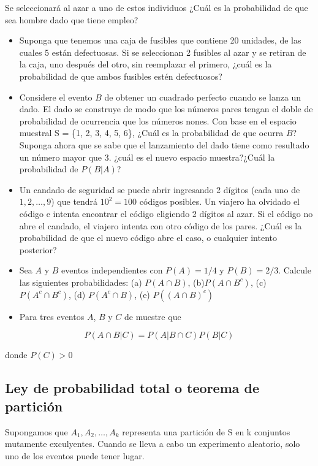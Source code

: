 \documentclass[11pt]{article}
\begin{document}
Se seleccionará al azar a uno de estos individuos ¿Cuál es la
probabilidad de que sea hombre dado que tiene empleo?

\begin{itemize}
\item
  Suponga que tenemos una caja de fusibles que contiene 20 unidades, de
  las cuales 5 están defectuosas. Si se seleccionan 2 fusibles al azar y
  se retiran de la caja, uno después del otro, sin reemplazar el
  primero, ¿cuál es la probabilidad de que ambos fusibles estén
  defectuosos?
\item
  Considere el evento \(B\) de obtener un cuadrado perfecto cuando se
  lanza un dado. El dado se construye de modo que los números pares
  tengan el doble de probabilidad de ocurrencia que los números nones.
  Con base en el espacio muestral S = \{1, 2, 3, 4, 5, 6\}, ¿Cuál es la
  probabilidad de que ocurra \(B\)? Suponga ahora que se sabe que el
  lanzamiento del dado tiene como resultado un número mayor que 3. ¿cuál
  es el nuevo espacio muestra?¿Cuál la probabilidad de \(P(B\vert A)\)?
\item
  Un candado de seguridad se puede abrir ingresando 2 dígitos (cada uno
  de \(1, 2,\ldots, 9\)) que tendrá \(10^{2} = 100\) códigos posibles.
  Un viajero ha olvidado el código e intenta encontrar el código
  eligiendo 2 dígitos al azar. Si el código no abre el candado, el
  viajero intenta con otro código de los pares. ¿Cuál es la probabilidad
  de que el nuevo código abre el caso, o cualquier intento posterior?
\item
  Sea \(A\) y \(B\) eventos independientes con \(P(A)=1/4\) y
  \(P(B)=2/3\). Calcule las siguientes probabilidades: (a)
  \(P(A\cap B)\), (b)\(P(A\cap B^{c})\), (c)\(P(A^{c}\cap B^{c})\), (d)
  \(P(A^{c}\cap B)\), (e) \(P((A\cap B)^{c})\)
\item
  Para tres eventos \(A\), \(B\) y \(C\) de muestre que
\end{itemize}

\[
P(A\cap B \vert C)= P(A\vert B \cap C)P(B\vert C)
\]

donde \(P(C)>0\)

    \hypertarget{ley-de-probabilidad-total-o-teorema-de-particiuxf3n}{%
\subsection{Ley de probabilidad total o teorema de
partición}\label{ley-de-probabilidad-total-o-teorema-de-particiuxf3n}}

Supongamos que \(A_{1},A_{2},\ldots, A_{k}\) representa una partición de
S en k conjuntos mutamente exculyentes. Cuando se lleva a cabo un
experimento aleatorio, solo uno de los eventos puede tener lugar.
\end{document}

